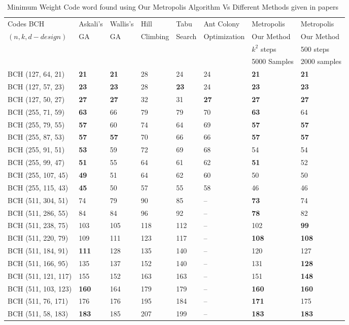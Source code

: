 \documentclass{sig-alternate-2013}
\begin{document}
\begin{table*}
\caption{Minimum Weight Code word found using  Our Metropolis Algorithm  
Vs Different Methods given in papers~\cite{ref1, ref2, ref3, ref4, ant}}
\label{t3}
\centering
\begin{tabular}{llllllll}
\hline
\noalign{\smallskip}
\centering
Codes BCH & Askali's  & Wallis's  & Hill & Tabu & Ant Colony&Metropolis& Metropolis \\
$(n, k, d-design)$ & GA & GA & Climbing & Search & Optimization& Our Method & Our Method\\
&\cite{ref1, ref4} &\cite{ref1, ref2} & \cite{ref1, ref4, ref2} 
&\cite{ref3, ref1, ref4, ref2} & \cite{ant}&$k^2$ steps & 500 steps\\
&&&&&&5000 Samples&2000 samples\\
\noalign{\smallskip}

\hline
\noalign{\smallskip}

BCH (127, 64, 21) & \bf{21} & \bf{21} & 28 & 24 & 24& \bf{21}&\bf{21}\\
\hline
BCH (127, 57, 23) & \bf{23} & \bf{23} & 28 & \bf{23}  &24& \bf{23}&\bf{23}\\
\hline
BCH (127, 50, 27) & \bf{27} & \bf{27} & 32 & 31 & \bf{27}&\bf{27}& \bf{27} \\
\hline
BCH (255, 71, 59) & \bf{63} & 66 & 79 & 79 & 70&\bf{63}&64\\
\hline
BCH (255, 79, 55) & \bf{57} & 60 & 74 & 64 & 69&\bf{57}&\bf{57}\\
\hline
BCH (255, 87, 53) & \bf{57} & \bf{57} & 70 & 66 & 66&\bf{57}&\bf{57}\\
\hline
BCH (255, 91, 51) & \bf{53} & 59 & 72 & 69& 68&54&54\\
\hline
BCH (255, 99, 47) & \bf{51} & 55 & 64 & 61 & 62 &\bf{51}&52\\
\hline
BCH (255, 107, 45)& \bf{49} & 51 & 64 & 62 & 60&50&50\\
\hline
BCH (255, 115, 43)& \bf{45} & 50 & 57 & 55 & 58&46&46\\
\hline 
BCH (511, 304, 51) &74 & 79 & 90 & 85 &--&\bf{73}&74\\
\hline
BCH (511, 286, 55) &84&84&96&92&--&\bf{78}&82\\
\hline
BCH (511, 238, 75)&103&105&118&112&--&102&\bf{99}\\
\hline
BCH (511, 220, 79) &109&111&123&117&--&\bf{108}&\bf{108}\\
\hline
BCH (511, 184, 91)& \bf{111}&128&135&140&--&120&127\\
\hline
BCH (511, 166, 95)&135&137&152&140&-- &131&\bf{128}\\
\hline
BCH (511, 121, 117)&155&152&163&163&--&151&\bf{148}\\
\hline
BCH (511, 103, 123)&\bf{160}&164&179&179&--&\bf{160}&\bf{160}\\
\hline
BCH (511, 76, 171)&176&176&195&184&--&\bf{171}&175\\
\hline
BCH (511, 58, 183)&\bf{183}&185&207&199&--&\bf{183}&\bf{183}\\
\hline
\end{tabular}
\end{table*}
\end{document}
